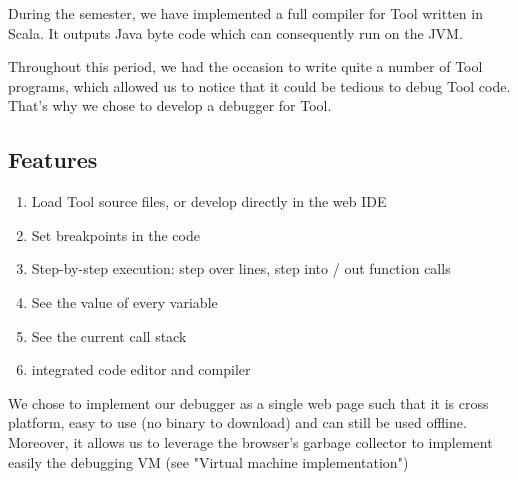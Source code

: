 During the semester, we have implemented a full compiler for Tool written in Scala. It outputs Java byte code which can consequently run on the JVM.

Throughout this period, we had the occasion to write quite a number of Tool programs, which allowed us to notice that it could be tedious to debug Tool code. That's why we chose to develop a debugger for Tool.

\subsection{Features}

\begin{enumerate}
\item Load Tool source files, or develop directly in the web IDE
\item Set breakpoints in the code
\item Step-by-step execution: step over lines, step into / out function calls
\item See the value of every variable
\item See the current call stack
\item integrated code editor and compiler
\end{enumerate}

We chose to implement our debugger as a single web page such that it is cross platform, easy to use (no binary to download) and can still be used offline. Moreover, it allows us to leverage the browser's garbage collector to implement easily the debugging VM (see "Virtual machine implementation")






